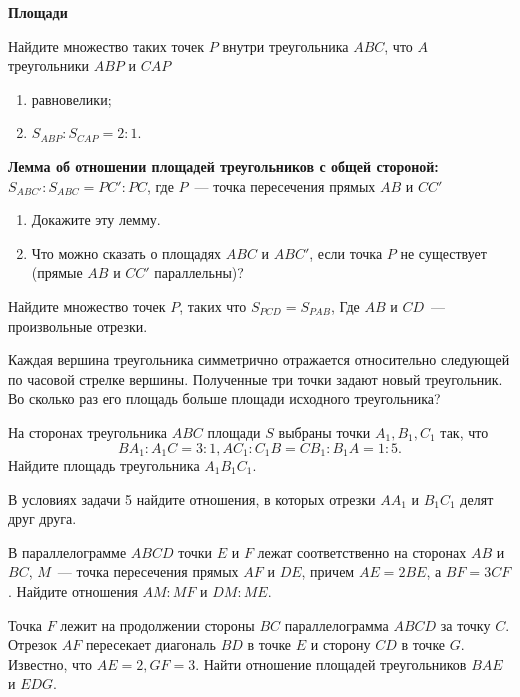 \documentclass{article}
\begin{document}
    \large

    \begin{center}
        \textbf{Площади}
    \end{center}

    \begin{enumerate_boxed}
        \item Найдите множество таких точек $P$ внутри треугольника $ABC$, что $A$ треугольники $ABP$ и $CAP$
        \begin{enumerate}
            \item равновелики;
            \item $S_{ABP} : S_{CAP} = 2:1$.
        \end{enumerate}
        \item \textbf{Лемма об отношении площадей треугольников с общей стороной:}
        $S_{ABC'} : S_{ABC} = PC' : PC$, где $P$~--- точка пересечения прямых $AB$ и $CC'$
        \begin{enumerate}
            \item Докажите эту лемму.
            \item Что можно сказать о площадях $ABC$ и $ABC'$, если точка $P$ не существует (прямые $AB$ и $CC'$ параллельны)?
        \end{enumerate}
        \item Найдите множество точек $P$, таких что $S_{PCD} = S_{PAB}$, Где $AB$ и $CD$~--- произвольные отрезки.
        \item Каждая вершина треугольника симметрично отражается относительно следующей по часовой стрелке вершины.
        Полученные три точки задают новый треугольник.
        Во сколько раз его площадь больше площади исходного треугольника?

        \item На сторонах треугольника $ABC$ площади $S$ выбраны точки $A_1, B_1, C_1$ так, что \[BA_1: A_{1}C = 3:1, AC_1:C_{1}B = CB_1:B_{1}A=1:5.
        \]
        Найдите площадь треугольника $A_{1}B_{1}C_1$.
        \item В условиях задачи 5 найдите отношения, в которых отрезки $AA_1$ и $B_{1}C_1$ делят друг друга.
        \item В параллелограмме $ABCD$ точки $E$ и $F$ лежат соответственно на сторонах $AB$ и $BC$, $M$~--- точка пересечения прямых $AF$ и $DE$, причем $AE = 2BE$, а $BF = 3CF$.
        Найдите отношения $AM:MF$ и $DM:ME$.
        \item Точка $F$ лежит на продолжении стороны $BC$ параллелограмма $ABCD$ за точку $C$.
        Отрезок $AF$ пересекает диагональ $BD$ в точке $E$ и сторону $CD$ в точке $G$.
        Известно, что $AE=2, GF=3$.
        Найти отношение площадей треугольников $BAE$ и $EDG$.


\end{enumerate_boxed}
\end{document}
